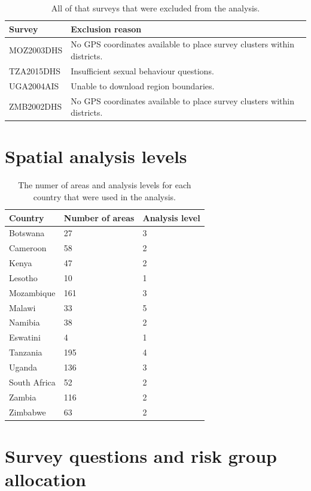 \documentclass[a4paper, nobind]{templates/ociamthesis}
\begin{document}
\begin{table}[h]
\centering
\begin{tabularx}{\textwidth}{lX}
\toprule
Survey & Exclusion reason \\ 
 \midrule
MOZ2003DHS & No GPS coordinates available to place survey clusters within districts. \\
TZA2015DHS & Insufficient sexual behaviour questions. \\
UGA2004AIS & Unable to download region boundaries. \\
ZMB2002DHS & No GPS coordinates available to place survey clusters within districts. \\
\bottomrule
\end{tabularx}
\label{tab:surveys-excluded}
\caption{All of that surveys that were excluded from the analysis.}
\end{table}

\hypertarget{spatial-analysis-levels}{%
\section{Spatial analysis levels}\label{spatial-analysis-levels}}

\begin{table}[h]
\centering
\begin{tabularx}{\textwidth}{lXX}
\toprule
Country & Number of areas & Analysis level \\ 
\midrule
Botswana & 27 & 3 \\ 
Cameroon & 58 & 2 \\ 
Kenya & 47 & 2 \\ 
Lesotho & 10 & 1 \\ 
Mozambique & 161 & 3 \\ 
Malawi & 33 & 5 \\ 
Namibia & 38 & 2 \\ 
Eswatini & 4 & 1 \\ 
Tanzania & 195 & 4 \\ 
Uganda & 136 & 3 \\ 
South Africa & 52 & 2 \\ 
Zambia & 116 & 2 \\ 
Zimbabwe & 63 & 2 \\ 
\bottomrule
\end{tabularx}
\label{tab:area-levels}
\caption{The numer of areas and analysis levels for each country that were used in the analysis.}
\end{table}

\hypertarget{survey-questions-and-risk-group-allocation}{%
\section{Survey questions and risk group allocation}\label{survey-questions-and-risk-group-allocation}}
\end{document}
